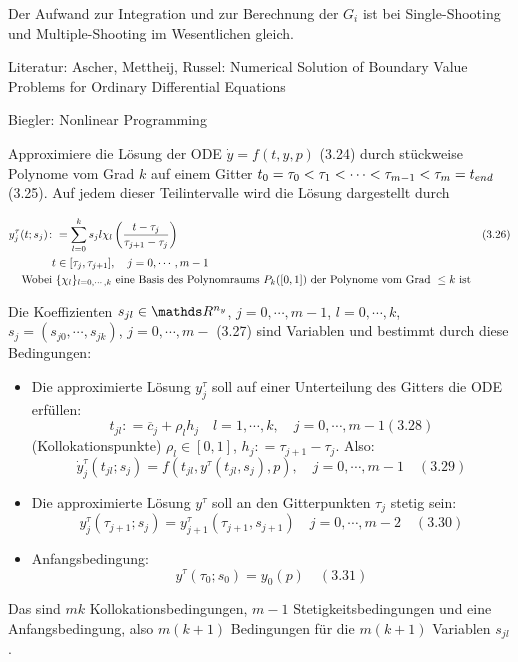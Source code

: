 
Der Aufwand zur Integration und zur Berechnung der $G_i$ ist bei Single-Shooting und Multiple-Shooting im Wesentlichen gleich.


Literatur: Ascher, Mettheij, Russel: Numerical Solution of Boundary Value Problems for Ordinary Differential Equations

Biegler: Nonlinear Programming


Approximiere die Lösung der ODE $\dot y = f(t,y,p)$ (3.24) durch stückweise Polynome vom Grad $k$ auf einem Gitter $t_0 = \tau_0 < \tau_1 < \cdots < \tau_{m-1} < \tau_m = t_{end}$ (3.25). Auf jedem dieser Teilintervalle wird die Lösung dargestellt durch

\begin{align*}
y_j^\tau (t; s_j) \colon&= \sum\limits_{l=0}^k s_j l \chi_l \left( \frac{t-\tau_j}{\tau_{j+1}-\tau_j} \right) & (3.26)\\
t &\in [\tau_j, \tau_{j+1}], \quad j=0,\cdots,m-1 \\
\text{Wobei } & \{ \chi_l \}_{l=0,\cdots,k} \text{ eine Basis des Polynomraums } P_k([0,1]) \text{ der Polynome vom Grad } \leq k \text{ ist}
\end{align*}

Die Koeffizienten $s_{jl} \in \R^{n_y}$, $j=0,\cdots,m-1$, $l=0,\cdots,k$, $s_j = (s_{j0},\cdots,s_{jk})$, $j=0,\cdots,m-$ (3.27) sind Variablen und bestimmt durch diese Bedingungen:

\begin{itemize}
\item Die approximierte Lösung $y_j^\tau$ soll auf einer Unterteilung des Gitters die ODE erfüllen:
\[ t_{jl} \colon= \overline c_j + \rho_l h_j \quad l= 1,\cdots,k, \quad j=0,\cdots,m-1 (3.28) \]
(Kollokationspunkte) $\rho_l \in [0,1]$, $h_j \colon= \tau_{j+1}-\tau_j$. Also:
\[ \dot y_j^\tau (t_{jl}; s_j) = f(t_{jl}, y^\tau (t_{jl},s_j),p), \quad j=0,\cdots,m-1 \quad (3.29) \]
\item Die approximierte Lösung $y^\tau$ soll an den Gitterpunkten $\tau_j$ stetig sein:
\[ y_j^\tau (\tau_{j+1};s_j) = y_{j+1}^\tau(\tau_{j+1},s_{j+1}) \quad j=0,\cdots,m-2 \quad (3.30) \]
\item Anfangsbedingung:
\[y^\tau(\tau_0;s_0) = y_0(p) \quad (3.31) \]
\end{itemize}

Das sind $mk$ Kollokationsbedingungen, $m-1$ Stetigkeitsbedingungen und eine Anfangsbedingung, also $m(k+1)$ Bedingungen für die $m(k+1)$ Variablen $s_{jl}$.

